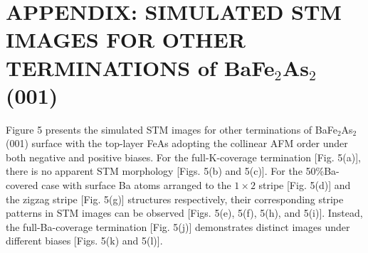 \documentclass[twocolumn,aps,showpacs,prb]{revtex4-1}
\begin{document}
\section{APPENDIX: SIMULATED STM IMAGES FOR OTHER TERMINATIONS of B\lowercase{a}F\lowercase{e}$_{2}$A\lowercase{s}$_{2}$(001)}

Figure 5 presents the simulated STM images for other terminations of BaFe$_{2}$As$_{2}$(001) surface with the top-layer FeAs adopting the collinear AFM order under both negative and positive biases. For the full-K-coverage termination [Fig. 5(a)], there is no apparent STM morphology [Figs. 5(b) and 5(c)]. For the 50\%Ba-covered case with surface Ba atoms arranged to the $1\times2$ stripe [Fig. 5(d)] and the zigzag stripe [Fig. 5(g)] structures respectively, their corresponding stripe patterns in STM images can be observed [Figs. 5(e), 5(f), 5(h), and 5(i)]. Instead, the full-Ba-coverage termination [Fig. 5(j)] demonstrates distinct images under different biases [Figs. 5(k) and 5(l)].
\end{document}
